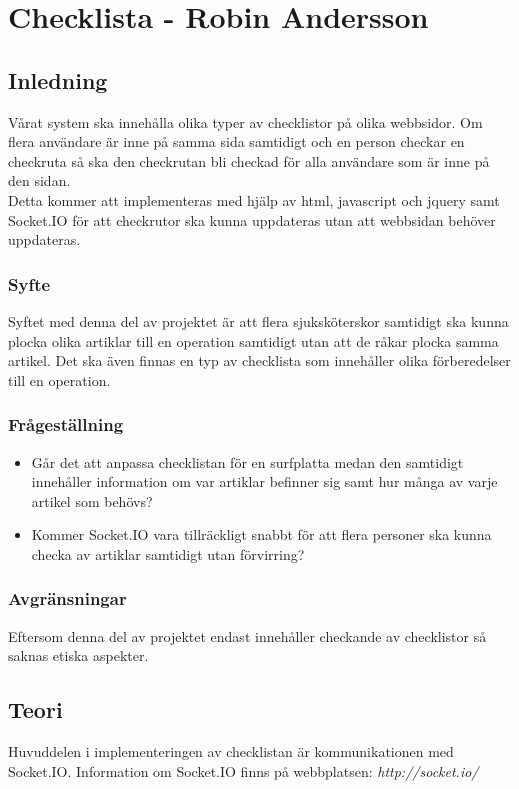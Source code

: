 \section{Checklista - Robin Andersson}
\subsection{Inledning}
Vårat system ska innehålla olika typer av checklistor på olika webbsidor. Om flera användare är inne på samma sida samtidigt och en person checkar en checkruta så ska den checkrutan bli checkad för alla användare som är inne på den sidan.\\

Detta kommer att implementeras med hjälp av html, javascript och jquery samt Socket.IO för att checkrutor ska kunna uppdateras utan att webbsidan behöver uppdateras.

\subsubsection{Syfte}
Syftet med denna del av projektet är att flera sjuksköterskor samtidigt ska kunna plocka olika artiklar till en operation samtidigt utan att de råkar plocka samma artikel. Det ska även finnas en typ av checklista som innehåller olika förberedelser till en operation. 

\subsubsection{Frågeställning}
\begin{itemize}
\item Går det att anpassa checklistan för en surfplatta medan den samtidigt innehåller information om var artiklar befinner sig samt hur många av varje artikel som behövs?
\item Kommer Socket.IO vara tillräckligt snabbt för att flera personer ska kunna checka av artiklar samtidigt utan förvirring?
\end{itemize}

\subsubsection{Avgränsningar}
Eftersom denna del av projektet endast innehåller checkande av checklistor så saknas etiska aspekter.

\subsection{Teori}
Huvuddelen i implementeringen av checklistan är kommunikationen med Socket.IO. Information om Socket.IO finns på webbplatsen: \textit{http://socket.io/}
 

